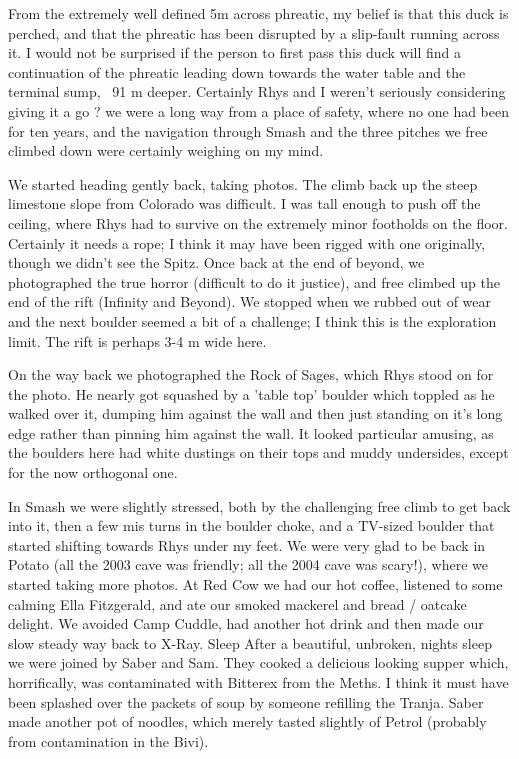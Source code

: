 From the extremely well defined 5m across phreatic, my belief is that this duck is perched, and that the phreatic has been disrupted by a slip-fault running across it. I would not be surprised if the person to first pass this duck will find a continuation of the phreatic leading down towards the water table and the terminal sump, ~91 m deeper.
Certainly Rhys and I weren't seriously considering giving it a go ? we were a long way from a place of safety, where no one had been for ten years, and the navigation through Smash and the three pitches we free climbed down were certainly weighing on my mind.

We started heading gently back, taking photos. The climb back up the steep limestone slope from Colorado was difficult. I was tall enough to push off the ceiling, where Rhys had to survive on the extremely minor footholds on the floor. Certainly it needs a rope; I think it may have been rigged with one originally, though we didn't see the Spitz.
Once back at the end of beyond, we photographed the true horror (difficult to do it justice), and free climbed up the end of the rift (Infinity and Beyond). We stopped when we rubbed out of wear and the next boulder seemed a bit of a challenge; I think this is the exploration limit. The rift is perhaps 3-4 m wide here.

On the way back we photographed the Rock of Sages, which Rhys stood on for the photo. He nearly got squashed by a 'table top' boulder which toppled as he walked over it, dumping him against the wall and then just standing on it's long edge rather than pinning him against the wall. It looked particular amusing, as the boulders here had white dustings on their tops and muddy undersides, except for the now orthogonal one.


In Smash we were slightly stressed, both by the challenging free climb to get back into it, then a few mis turns in the boulder choke, and a TV-sized boulder that started shifting towards Rhys under my feet. We were very glad to be back in Potato (all the 2003 cave was friendly; all the 2004 cave was scary!), where we started taking more photos.
At Red Cow we had our hot coffee, listened to some calming Ella Fitzgerald, and ate our smoked mackerel and bread / oatcake delight. We avoided Camp Cuddle, had another hot drink and then made our slow steady way back to X-Ray.
Sleep
After a beautiful, unbroken, nights sleep we were joined by Saber and Sam. They cooked a delicious looking supper which, horrifically, was contaminated with Bitterex from the Meths. I think it must have been splashed over the packets of soup by someone refilling the Tranja. Saber made another pot of noodles, which merely tasted slightly of Petrol (probably from contamination in the Bivi).


